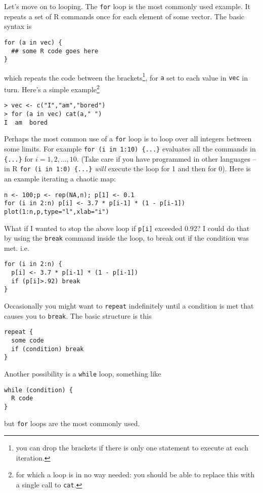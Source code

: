 \documentclass[10pt] {article}
\newcommand{\eps}[3]
{{\begin{center}
 \rotatebox{#1}{\scalebox{#2}{\texttt{[image: \#3]}}}
 \end{center}}
}
\theoremstyle{definition}
\begin{document}
Let's move on to looping. The {\tt for} loop is the most commonly used example. It repeats a set of R commands once for each element of some vector. The basic syntax is 
\begin{lstlisting}
for (a in vec) {
  ## some R code goes here
}
\end{lstlisting} 
which repeats the code between the brackets\footnote{you can drop the brackets if there is only one statement to execute at each iteration.}, for {\tt a} set to each value in {\tt vec} in turn. Here's a simple example\footnote{for which a loop is in no way needed: you should be able to replace this with a single call to {\tt cat}.}
\begin{lstlisting}
> vec <- c("I","am","bored")
> for (a in vec) cat(a," ")
I  am  bored
\end{lstlisting}
Perhaps the most common use of a {\tt for} loop is to loop over all integers between some limits. For example \lstinline+for (i in 1:10) {...}+ evaluates all the commands in \lstinline+{...}+ for $i=1,2,\ldots,10$. (Take care if you have programmed in other languages -- in R \lstinline+for (i in 1:0) {...}+ {\em will} execute the loop for 1 and then for 0). Here is an example iterating a chaotic map:
\begin{lstlisting}
n <- 100;p <- rep(NA,n); p[1] <- 0.1
for (i in 2:n) p[i] <- 3.7 * p[i-1] * (1 - p[i-1]) 
plot(1:n,p,type="l",xlab="i")
\end{lstlisting}
\eps{-90}{.6}{chaos.eps}

\noindent What if I wanted to stop the above loop if \lstinline+p[i]+ exceeded 0.92? I could do that by using the {\tt break} command inside the loop, to break out if the condition was met. i.e. 
\begin{lstlisting}
for (i in 2:n) { 
  p[i] <- 3.7 * p[i-1] * (1 - p[i-1])
  if (p[i]>.92) break
}   
\end{lstlisting}
Occasionally you might want to {\tt repeat} indefinitely until a condition is met that causes you to {\tt break}. The basic structure is this 
\begin{lstlisting}
repeat {
  some code
  if (condition) break
}
\end{lstlisting}
Another possibility is a {\tt while} loop, something like 
\begin{lstlisting}
while (condition) {
  R code
}
\end{lstlisting}
but {\tt for} loops are the most commonly used.
\end{document}
